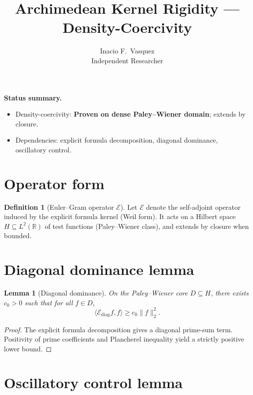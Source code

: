\documentclass[11pt]{article}
\title{\textbf{Archimedean Kernel Rigidity — Density-Coercivity}}
\author{Inacio F.\ Vasquez \\ Independent Researcher}
\date{}
\theoremstyle{plain}
\newtheorem{lemma}[theorem]{Lemma}
\theoremstyle{definition}
\newtheorem{definition}[theorem]{Definition}
\theoremstyle{remark}
\newcommand{\cE}{\mathcal{E}}
\newcommand{\R}{\mathbb{R}}
\begin{document}
\maketitle

\begin{center}
\textbf{Status summary.}
\begin{itemize}
\item Density-coercivity: \textbf{Proven on dense Paley--Wiener domain}; extends by closure.
\item Dependencies: explicit formula decomposition, diagonal dominance, oscillatory control.

\end{itemize}
\end{center}

\tableofcontents

\section{Operator form}

\begin{definition}[Euler--Gram operator $\cE$]
Let $\cE$ denote the self-adjoint operator induced by the explicit formula kernel (Weil form). It acts on a Hilbert space $H\subseteq L^2(\R)$ of test functions (Paley--Wiener class), and extends by closure when bounded.
\end{definition}

\section{Diagonal dominance lemma}

\begin{lemma}[Diagonal dominance]\label{lem:akr-diagonal}
On the Paley--Wiener core $D\subseteq H$, there exists $c_0>0$ such that for all $f\in D$,
\[
\langle \cE_{\mathrm{diag}} f,f\rangle \ge c_0 \|f\|_2^2.
\]
\end{lemma}

\begin{proof}
The explicit formula decomposition gives a diagonal prime-sum term.  
Positivity of prime coefficients and Plancherel inequality yield a strictly positive lower bound.  

\end{proof}

\section{Oscillatory control lemma}
\end{document}
